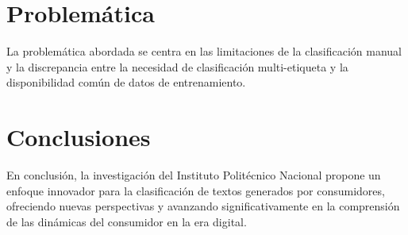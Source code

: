 \documentclass[12pt]{article}
\begin{document}
\section{Problemática}
La problemática abordada se centra en las limitaciones de la clasificación manual y la discrepancia entre la necesidad de clasificación multi-etiqueta y la disponibilidad común de datos de entrenamiento.

\section{Conclusiones}
En conclusión, la investigación del Instituto Politécnico Nacional propone un enfoque innovador para la clasificación de textos generados por consumidores, ofreciendo nuevas perspectivas y avanzando significativamente en la comprensión de las dinámicas del consumidor en la era digital.
\end{document}
